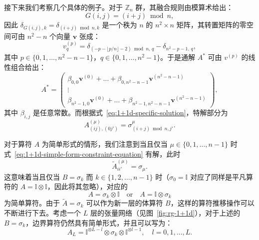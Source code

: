 接下来我们考察几个具体的例子。对于 $\mathbb{Z}_n$ 群，其融合规则由模算术给出：
\begin{equation}
  G(i,j) = (i+j)\bmod n,
  \label{eq:Z_n-fusion-rules}
\end{equation}
因此 $\delta_{G(i,j),k}=\delta_{(i+j)\bmod n,k}$ 是一个秩为 $n$ 的 $n^2\times n$ 矩阵，其转置矩阵的零空间可由 $n^2-n$ 个向量 $\bm{v}$ 张成：
\begin{equation}
  v^{(p)}_q = \delta_{(-p-\lfloor p/n\rfloor-2)\bmod n, \, q} - \delta_{n^2-p-1, \, q},
\end{equation}
其中 $p\in\{0,1,\dots,n^2-n-1\}$，$q\in\{0,1,\dots,n^2-1\}$。于是通解 $A^*$ 可由 $v^{(p)}$ 的线性组合给出：
\begin{equation}
  A^* = \begin{pmatrix}
    \beta_{0,0} \bm{v}^{(0)} + \dots + \beta_{0,n^2-n-1} \bm{v}^{(n^2-n-1)} \\
    \vdots \\
    \beta_{n^2-1,0} \bm{v}^{(0)} + \dots + \beta_{n^2-1,n^2-n-1} \bm{v}^{(n^2-n-1)}
  \end{pmatrix},
\end{equation}
其中 $\beta_{i,j}$ 是任意常数。而根据式~\eqref{eq:1+1d-specific-solution}，特解部分为
\begin{equation}
  A^{(\mu)}_{(ij), (0j')} = \sigma^\mu_{(i+j)\bmod n, j'}.
\end{equation}

对于算符 $A$ 为简单形式的情形，我们注意到当且仅当 $\mu\in\{0,1,\dots,n-1\}$ 时式~\eqref{eq:1+1d-simple-form-constraint-equation} 有解，此时
\begin{equation}
  \tilde{A}^{(\mu)}_{ii'} = \sigma_\mu.
\end{equation}
这意味着当且仅当 $B=\sigma_k$ 而 $k\in\{1,2,\dots,n-1\}$ 时（$\sigma_0=\mathbb{I}$ 对应了同样是平凡算符的 $A=\mathbb{I}\otimes\mathbb{I}$，因此将其忽略），对应的
\begin{equation}
  A = \sigma_k   \otimes \mathbb{I} \quad \text{or} \quad
  A = \mathbb{I} \otimes \sigma_k
\end{equation}
为简单算符。由于 $\tilde{A}=\sigma_k$ 可以作为新一层的体算符 $B$，这样的算符推移操作可以不断进行下去。考虑一个 $L$ 层的张量网络（见图~\ref{fig:rg-1+1d}），对于上述的 $B=\sigma_k$，边界算符仍然具有简单形式，并且可以写为：
\begin{equation}
  A_L = \mathbb{I}^{\otimes L-l} \otimes \sigma_k \otimes \mathbb{I}^{\otimes l-1}, \quad l = 0,1,\dots,L.
\end{equation}

